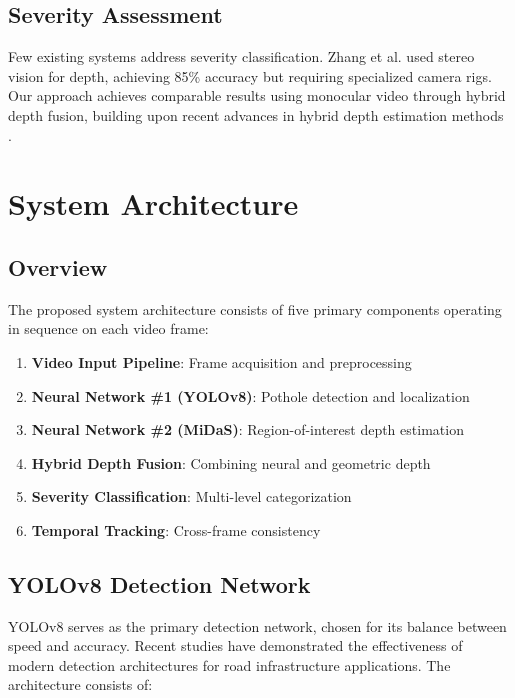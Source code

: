 \documentclass[conference]{IEEEtran}
\begin{document}
\subsection{Severity Assessment}

Few existing systems address severity classification. Zhang et al. \cite{zhang_severity} used stereo vision for depth, achieving 85\% accuracy but requiring specialized camera rigs. Our approach achieves comparable results using monocular video through hybrid depth fusion, building upon recent advances in hybrid depth estimation methods \cite{jindal_hybrid, baroudi_enhanced}.

\section{System Architecture}

\subsection{Overview}

The proposed system architecture consists of five primary components operating in sequence on each video frame:

\begin{enumerate}
    \item \textbf{Video Input Pipeline}: Frame acquisition and preprocessing
    \item \textbf{Neural Network \#1 (YOLOv8)}: Pothole detection and localization
    \item \textbf{Neural Network \#2 (MiDaS)}: Region-of-interest depth estimation
    \item \textbf{Hybrid Depth Fusion}: Combining neural and geometric depth
    \item \textbf{Severity Classification}: Multi-level categorization
    \item \textbf{Temporal Tracking}: Cross-frame consistency
\end{enumerate}

\subsection{YOLOv8 Detection Network}

YOLOv8 \cite{yolov8} serves as the primary detection network, chosen for its balance between speed and accuracy. Recent studies \cite{kumar_yolov8, reddy_rtdetr} have demonstrated the effectiveness of modern detection architectures for road infrastructure applications. The architecture consists of:
\end{document}
